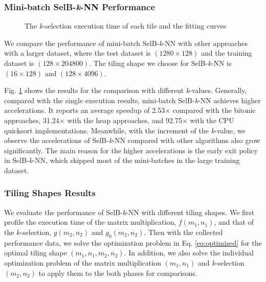 \subsubsection{Mini-batch SelB-\textit{k}-NN Performance}

\begin{figure}[tbp]
    \caption{The \textit{k}-selection execution time of each tile and the fitting curves}
    \label{fig:multi_results}
    \end{figure}

We compare the performance of mini-batch SelB-\textit{k}-NN with other approaches with a larger dataset, where the test dataset is $(1280 \times 128)$ and the training dataset is $(128 \times 204800)$. The tiling shape we choose for SelB-\textit{k}-NN is $(16 \times 128)$ and $(128 \times 4096)$. 

Fig. \ref{fig:multi_results} shows the results for the comparison with different \textit{k}-values. Generally, compared with the single execution results, mini-batch SelB-\textit{k}-NN achieves higher accelerations. It reports an average speedup of 2.53$\times$ compared with the bitonic approaches, 31.24$\times$ with the heap approaches, and 92.75$\times$ with the CPU quicksort implementations. Meanwhile, with the increment of the \textit{k}-value, we observe the accelerations of SelB-\textit{k}-NN compared with other algorithms also grow significantly. The main reason for the higher accelerations is the early exit policy in SelB-\textit{k}-NN, which skipped most of the mini-batches in the large training dataset. 

\subsubsection{Tiling Shapes Results}

We evaluate the performance of SelB-\textit{k}-NN with different tiling shapes. We first profile the execution time of the matrix multiplication, $f(m_1, n_1)$, and that of the $k$-selection, $g(m_2, n_2)$ and $g_{0}(m_2, n_2)$. Then with the collected performance data, we solve the optimization problem in Eq. \ref{eq:optimized} for the optimal tiling shape $(m_1, n_1, m_2, n_2)$. In addition, we also solve the individual optimization problem of the matrix multiplication $(m_1, n_1)$ and \textit{k}-selection $(m_2, n_2)$ to apply them to the both phases for comparisons.


